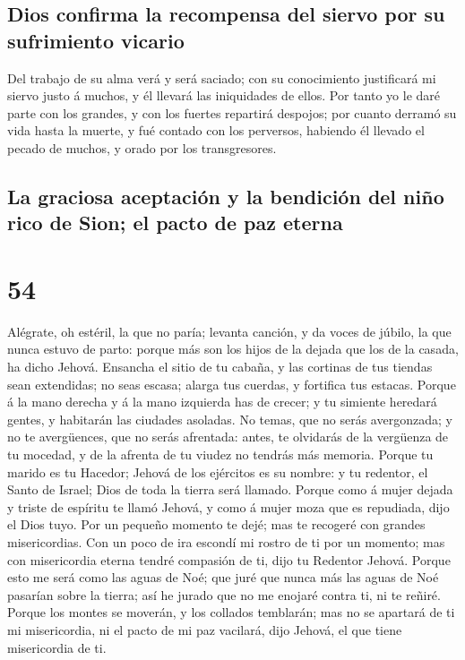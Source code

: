 \hypertarget{dios-confirma-la-recompensa-del-siervo-por-su-sufrimiento-vicario}{%
\subsection{Dios confirma la recompensa del siervo por su sufrimiento
vicario}\label{dios-confirma-la-recompensa-del-siervo-por-su-sufrimiento-vicario}}

 Del trabajo de su alma verá y será saciado; con su
conocimiento justificará mi siervo justo á muchos, y él llevará las
iniquidades de ellos.  Por tanto yo le daré parte con los
grandes, y con los fuertes repartirá despojos; por cuanto derramó su
vida hasta la muerte, y fué contado con los perversos, habiendo él
llevado el pecado de muchos, y orado por los transgresores.

\hypertarget{la-graciosa-aceptaciuxf3n-y-la-bendiciuxf3n-del-niuxf1o-rico-de-sion-el-pacto-de-paz-eterna}{%
\subsection{La graciosa aceptación y la bendición del niño rico de Sion;
el pacto de paz
eterna}\label{la-graciosa-aceptaciuxf3n-y-la-bendiciuxf3n-del-niuxf1o-rico-de-sion-el-pacto-de-paz-eterna}}

\hypertarget{section-23-54}{%
\section{54}\label{section-23-54}}

 Alégrate, oh estéril, la que no paría; levanta canción, y
da voces de júbilo, la que nunca estuvo de parto: porque más son los
hijos de la dejada que los de la casada, ha dicho Jehová. 
Ensancha el sitio de tu cabaña, y las cortinas de tus tiendas sean
extendidas; no seas escasa; alarga tus cuerdas, y fortifica tus estacas.
 Porque á la mano derecha y á la mano izquierda has de
crecer; y tu simiente heredará gentes, y habitarán las ciudades
asoladas.  No temas, que no serás avergonzada; y no te
avergüences, que no serás afrentada: antes, te olvidarás de la vergüenza
de tu mocedad, y de la afrenta de tu viudez no tendrás más memoria.
 Porque tu marido es tu Hacedor; Jehová de los ejércitos
es su nombre: y tu redentor, el Santo de Israel; Dios de toda la tierra
será llamado.  Porque como á mujer dejada y triste de
espíritu te llamó Jehová, y como á mujer moza que es repudiada, dijo el
Dios tuyo.  Por un pequeño momento te dejé; mas te
recogeré con grandes misericordias.  Con un poco de ira
escondí mi rostro de ti por un momento; mas con misericordia eterna
tendré compasión de ti, dijo tu Redentor Jehová.  Porque
esto me será como las aguas de Noé; que juré que nunca más las aguas de
Noé pasarían sobre la tierra; así he jurado que no me enojaré contra ti,
ni te reñiré.  Porque los montes se moverán, y los
collados temblarán; mas no se apartará de ti mi misericordia, ni el
pacto de mi paz vacilará, dijo Jehová, el que tiene misericordia de ti.

